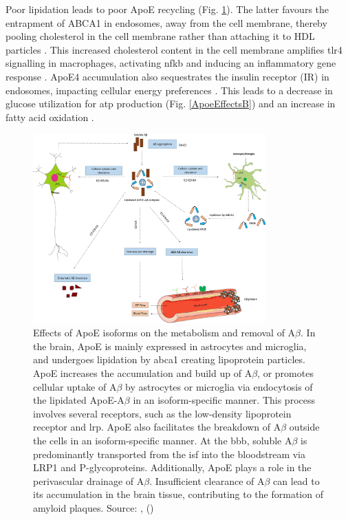 \documentclass{amsart}
\begin{document}
Poor lipidation leads to poor ApoE recycling \cite{Yassine2020APOEDisease} (Fig. \ref{ApoeEffectsA}). The latter favours the entrapment of ABCA1 in endosomes, away from the cell membrane, thereby pooling cholesterol in the cell membrane rather than attaching it to HDL particles \cite{Rawat2019ApoE4Astrocytes}. This increased cholesterol content in the cell membrane amplifies \acrfull{tlr4} signalling in macrophages, activating \acrshort{nfkb} and inducing an inflammatory gene response \cite{Yassine2020APOEDisease}.  ApoE4 accumulation also sequestrates the insulin receptor (IR) in endosomes, impacting cellular energy preferences \cite{Zhao2017ApolipoproteinEndosomes}. This leads to a decrease in glucose utilization for \acrshort{atp} production (Fig. \ref{ApoeEffectsB}) and an increase in fatty acid oxidation \cite{Svennerholm1997ChangesSwedes}. 

\begin{figure}[t]
  \includegraphics[width=0.8\textwidth]{figures/ApoEeffectsB.jpg}
    \caption{Effects of ApoE isoforms on the metabolism and removal of A$\beta$. In the brain, ApoE is mainly expressed in astrocytes and microglia, and undergoes lipidation by \acrfull{abca1} creating lipoprotein particles. ApoE increases the accumulation and build up of A$\beta$, or promotes cellular uptake of A$\beta$ by astrocytes or microglia via endocytosis of the lipidated ApoE-A$\beta$ in an isoform-specific manner. This process involves several receptors, such as the low-density lipoprotein receptor and \acrfull{lrp}. ApoE also facilitates the breakdown of A$\beta$ outside the cells in an isoform-specific manner. At the \acrlong{bbb}, soluble A$\beta$ is predominantly transported from the \acrfull{isf} into the bloodstream via LRP1 and P-glycoproteins. Additionally, ApoE plays a role in the perivascular drainage of A$\beta$. Insufficient clearance of A$\beta$ can lead to its accumulation in the brain tissue, contributing to the formation of amyloid plaques. Source: ,  (\citeyear{Husain2021APOETherapeutics}) \cite{Husain2021APOETherapeutics}}
  \label{ApoeEffectsA}
\end{figure}
\end{document}
